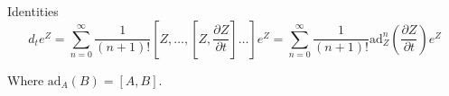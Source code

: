 \begin{subappendices}
\begin{section}{Identities}
\begin{equation}
\label{SneidersID}
d_t e^{Z} = \sum_{n=0}^\infty \frac{1}{(n+1)!} \left[Z, \dots, \left[Z, \frac{\partial Z}{\partial t}\right] \dots \right] e^Z = \sum_{n=0}^\infty \frac{1}{(n+1)!} \text{ad}_Z ^n \left(\frac{\partial Z}{\partial t}\right) e^Z
\end{equation}

Where $\text{ad}_A(B) = [A,B]$.

\end{section}

\end{subappendices}







